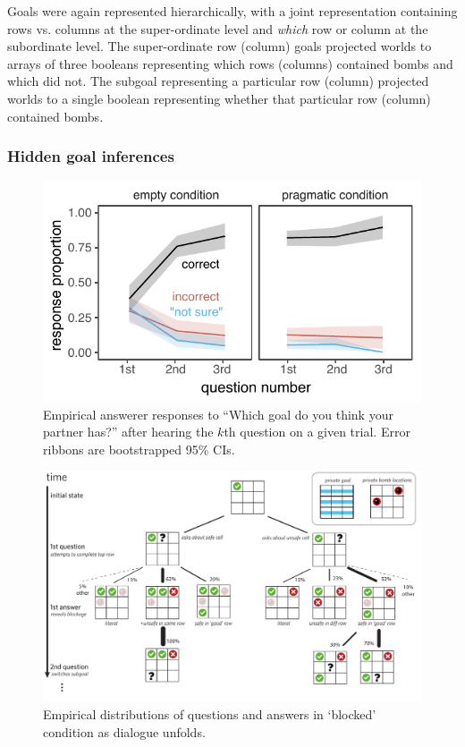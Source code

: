 \documentclass[11pt, floatsintext]{apa6}
\begin{document}
Goals were again represented hierarchically, with a joint representation containing rows vs. columns at the super-ordinate level and \emph{which} row or column at the subordinate level.
The super-ordinate row (column) goals projected worlds to arrays of three booleans representing which rows (columns) contained bombs and which did not.
The subgoal representing a particular row (column) projected worlds to a single boolean representing whether that particular row (column) contained bombs.

\subsubsection{Hidden goal inferences}


\begin{figure}[t!]
\begin{center}
\includegraphics[scale = .8]{Exp3/spatialGoalInference_final.pdf}
\end{center}
\caption{Empirical answerer responses to ``Which goal do you think your partner has?''  after hearing the $k$th question on a given trial. Error ribbons are bootstrapped 95\% CIs.}
\label{fig:exp3goalinference}
\end{figure}


\begin{figure}[t!]
\begin{center}
\includegraphics[scale = .6]{Exp3/blocked.pdf}
\end{center}
\caption{Empirical distributions of questions and answers in `blocked' condition as dialogue unfolds.}
\label{fig:blocked}
\end{figure}
\end{document}
